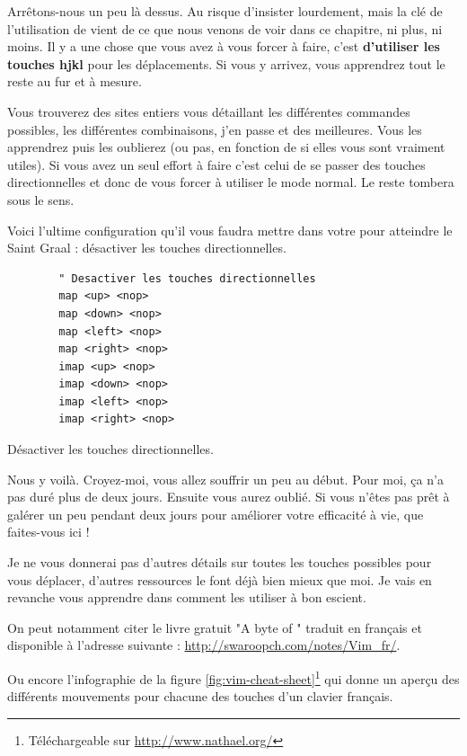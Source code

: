 Arrêtons-nous un peu là dessus. Au risque d'insister lourdement, mais la clé de l'utilisation de \vim vient de ce que nous venons de voir dans ce chapitre, ni plus, ni moins. Il y a une chose que vous avez à vous forcer à faire, c'est \textbf{d'utiliser les touches hjkl} pour les déplacements. Si vous y arrivez, vous apprendrez tout le reste au fur et à mesure.

Vous trouverez des sites entiers vous détaillant les différentes commandes possibles, les différentes combinaisons, j'en passe et des meilleures. Vous les apprendrez puis les oublierez (ou pas, en fonction de si elles vous sont vraiment utiles). Si vous avez un seul effort à faire c'est celui de se passer des touches directionnelles et donc de vous forcer à utiliser le mode normal. Le reste tombera sous le sens.

Voici l'ultime configuration qu'il vous faudra mettre dans votre \vimrc pour atteindre le Saint Graal : désactiver les touches directionnelles.

\begin{listing}[H]

    \begin{verbatim}
        " Desactiver les touches directionnelles
        map <up> <nop>
        map <down> <nop>
        map <left> <nop>
        map <right> <nop>
        imap <up> <nop>
        imap <down> <nop>
        imap <left> <nop>
        imap <right> <nop>
    \end{verbatim}
    \caption{Désactiver les touches directionnelles.}
    \label{code:touches-directionnelles}
\end{listing}

Nous y voilà. Croyez-moi, vous allez souffrir un peu au début. Pour moi, ça n'a pas duré plus de deux jours. Ensuite vous aurez oublié. Si vous n'êtes pas prêt à galérer un peu pendant deux jours pour améliorer votre efficacité à vie, que faites-vous ici !

Je ne vous donnerai pas d'autres détails sur toutes les touches possibles pour vous déplacer, d'autres ressources le font déjà bien mieux que moi. Je vais en revanche vous apprendre dans  comment les utiliser à bon escient.

On peut notamment citer le livre gratuit "A byte of \vim" traduit en français et disponible à l'adresse suivante : \url{http://swaroopch.com/notes/Vim_fr/}.

Ou encore l'infographie de la figure \ref{fig:vim-cheat-sheet}\footnote{Téléchargeable sur \url{http://www.nathael.org/}} qui donne un aperçu des différents mouvements pour chacune des touches d'un clavier français.

